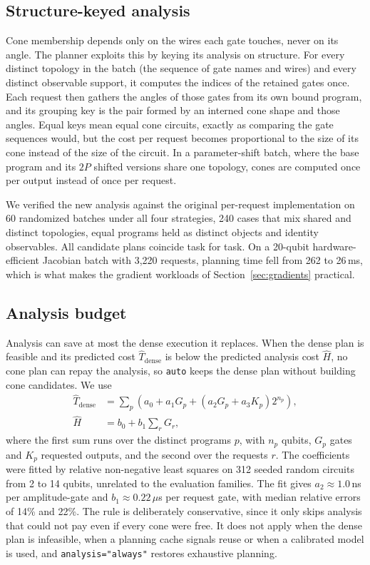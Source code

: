 \subsection{Structure-keyed analysis}
Cone membership depends only on the wires each gate touches, never on its angle. The planner exploits this by keying its analysis on structure. For every distinct topology in the batch (the sequence of gate names and wires) and every distinct observable support, it computes the indices of the retained gates once. Each request then gathers the angles of those gates from its own bound program, and its grouping key is the pair formed by an interned cone shape and those angles. Equal keys mean equal cone circuits, exactly as comparing the gate sequences would, but the cost per request becomes proportional to the size of its cone instead of the size of the circuit. In a parameter-shift batch, where the base program and its $2P$ shifted versions share one topology, cones are computed once per output instead of once per request.

We verified the new analysis against the original per-request implementation on 60 randomized batches under all four strategies, 240 cases that mix shared and distinct topologies, equal programs held as distinct objects and identity observables. All candidate plans coincide task for task. On a 20-qubit hardware-efficient Jacobian batch with 3,220 requests, planning time fell from 262 to 26\,ms, which is what makes the gradient workloads of Section~\ref{sec:gradients} practical.

\subsection{Analysis budget}
Analysis can save at most the dense execution it replaces. When the dense plan is feasible and its predicted cost $\widehat T_{\mathrm{dense}}$ is below the predicted analysis cost $\widehat H$, no cone plan can repay the analysis, so \texttt{auto} keeps the dense plan without building cone candidates. We use
\begin{align}
\widehat T_{\mathrm{dense}}&=\sum_{p}\left(a_0+a_1G_p+\left(a_2G_p+a_3K_p\right)2^{n_p}\right),\\
\widehat H&=b_0+b_1\sum_r G_r,
\end{align}
where the first sum runs over the distinct programs $p$, with $n_p$ qubits, $G_p$ gates and $K_p$ requested outputs, and the second over the requests $r$. The coefficients were fitted by relative non-negative least squares on 312 seeded random circuits from 2 to 14 qubits, unrelated to the evaluation families. The fit gives $a_2\approx1.0$\,ns per amplitude-gate and $b_1\approx0.22\,\mu$s per request gate, with median relative errors of 14\% and 22\%. The rule is deliberately conservative, since it only skips analysis that could not pay even if every cone were free. It does not apply when the dense plan is infeasible, when a planning cache signals reuse or when a calibrated model is used, and \texttt{analysis="always"} restores exhaustive planning.

